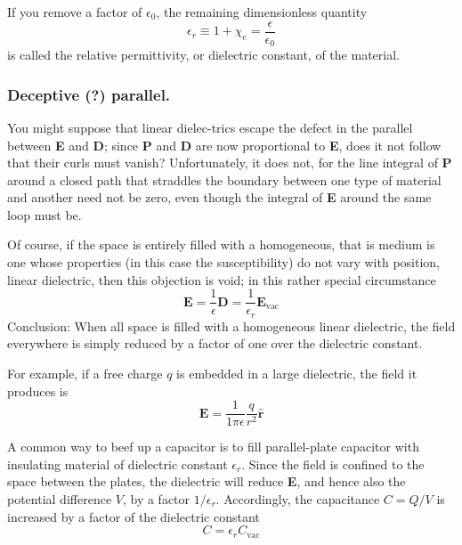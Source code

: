 \documentclass[../../../main.tex]{subfiles}
\begin{document}
If you remove a factor of $\epsilon_0$, the remaining dimensionless quantity
\begin{equation*}
    \epsilon_r\equiv1+\chi_e=\frac{\epsilon}{\epsilon_0}
\end{equation*}
is called the relative permittivity, or dielectric constant, of the material.

\subsubsection{Deceptive (?) parallel.} You might suppose that linear dielec-trics escape the defect in the parallel between \textbf{E} and \textbf{D}; since \textbf{P} and \textbf{D} are now proportional to \textbf{E}, does it not follow that their curls must vanish? Unfortunately, it does not, for the line integral of \textbf{P} around a closed path that straddles the boundary between one type of material and another need not be zero, even though the integral of \textbf{E} around the same loop must be.

Of course, if the space is entirely ﬁlled with a homogeneous, that is medium is one whose properties (in this case the susceptibility) do not vary with position, linear dielectric, then this objection is void; in this rather special circumstance
\begin{equation*}
    \mathbf{E}=\frac{1}{\epsilon}\mathbf{D}=\frac{1}{\epsilon_r}\mathbf{E}_{\text{vac}}
\end{equation*}
Conclusion: When all space is filled with a homogeneous linear dielectric, the field everywhere is simply reduced by a factor of one over the dielectric constant.

For example, if a free charge $q$ is embedded in a large dielectric, the field it produces is
\begin{equation*}
    \mathbf{E}=\frac{1}{1\pi\epsilon}\frac{q}{r^2}\mathbf{\hat{r}}
\end{equation*}

A common way to beef up a capacitor is to fill parallel-plate capacitor with insulating material of dielectric constant $\epsilon_r$. Since the field is confined to the space between the plates, the dielectric will reduce \textbf{E}, and hence also the potential difference $V$, by a factor $1/\epsilon_r$. Accordingly, the capacitance $C = Q/V$ is increased by a factor of the dielectric constant
\begin{equation*}
    C=\epsilon_rC_{\text{vac}}
\end{equation*}
\end{document}
